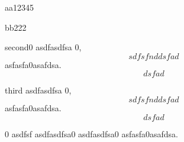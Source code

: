 \documentclass[11pt]{exam}%
\begin{document}
\newpage%
\addpoints%
\begin{questions}%
\question[1]%
aa12345%
\begin{solution}%
bb222%
\end{solution}%
%
\question%
second0
asdfasdfsa $0$, \begin{equation}sdfsfnd{dsfad}
\end{equation}asfasfa0asafdsa.\[dsfad\]%
%
\question[3]%
third
asdfasdfsa $0$, \begin{equation}sdfsfnd{dsfad}
\end{equation}asfasfa0asafdsa.\[dsfad\]%
\begin{solution}%
0 asdfsf
asdfasdfsa0
asdfasdfsa0
asfasfa0asafdsa.%
\end{solution}%
%
\end{questions}%
\end{document}
